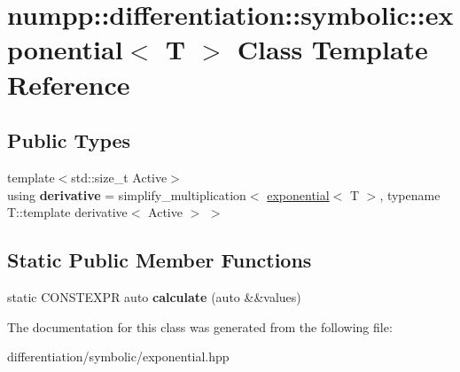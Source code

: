 \hypertarget{classnumpp_1_1differentiation_1_1symbolic_1_1exponential}{}\section{numpp\+:\+:differentiation\+:\+:symbolic\+:\+:exponential$<$ T $>$ Class Template Reference}
\label{classnumpp_1_1differentiation_1_1symbolic_1_1exponential}
\subsection*{Public Types}
\begin{DoxyCompactItemize}
\item 
\mbox{\label{classnumpp_1_1differentiation_1_1symbolic_1_1exponential_a3627b60b251a1a80cc009ac8d1a68674}} 
{\footnotesize template$<$std\+::size\+\_\+t Active$>$ }\\using {\bfseries derivative} = simplify\+\_\+multiplication$<$ \hyperlink{classnumpp_1_1differentiation_1_1symbolic_1_1exponential}{exponential}$<$ T $>$, typename T\+::template derivative$<$ Active $>$ $>$
\end{DoxyCompactItemize}
\subsection*{Static Public Member Functions}
\begin{DoxyCompactItemize}
\item 
\mbox{\label{classnumpp_1_1differentiation_1_1symbolic_1_1exponential_a6366faad35aeb046cfccb85208347a61}} 
static C\+O\+N\+S\+T\+E\+X\+PR auto {\bfseries calculate} (auto \&\&values)
\end{DoxyCompactItemize}


The documentation for this class was generated from the following file\+:\begin{DoxyCompactItemize}
\item 
differentiation/symbolic/exponential.\+hpp\end{DoxyCompactItemize}
